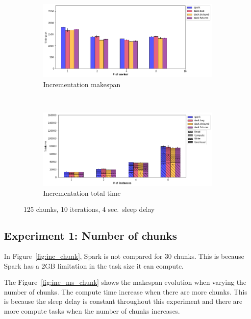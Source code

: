 \documentclass[conference]{IEEEtran}
\begin{document}
\begin{figure}[!b]
    \centering
    \begin{subfigure}[b]{\columnwidth}
        \includegraphics[clip,width=\columnwidth]{images/inc_worker.png}%
        \caption{Incrementation makespan}\label{fig:inc_ms_worker}
    \end{subfigure}
    \\
    \begin{subfigure}[b]{\columnwidth}
        \includegraphics[clip,width=\columnwidth]{images/inc_idle_worker.png}%
        \caption{Incrementation total time}\label{fig:inc_tt_worker}
    \end{subfigure}
    \caption{125 chunks, 10 iterations, 4 sec.\ sleep delay}\label{fig:inc_worker}
\end{figure}

\subsection{Experiment 1: Number of chunks}
In Figure~\ref{fig:inc_chunk}, Spark is not compared for 30 chunks. This is because
Spark has a 2GB limitation in the task size it can compute.

The Figure~\ref{fig:inc_ms_chunk} shows the makespan evolution when varying the
number of chunks. The compute time increase when there are more chunks. This is
because the sleep delay is constant throughout this experiment and there are more
compute tasks when the number of chunks increases.
\end{document}
